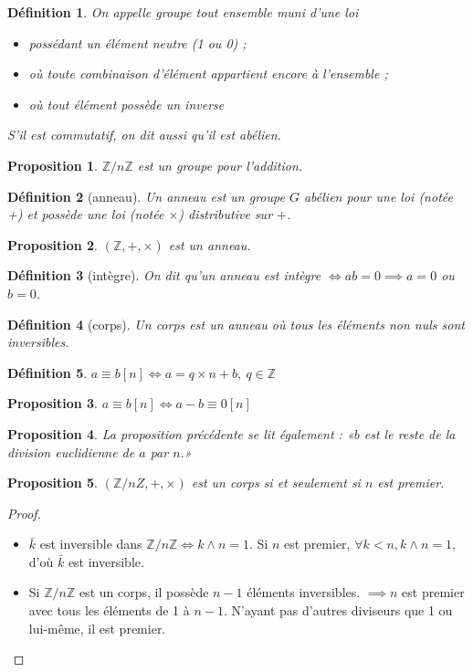 \documentclass[french]{article}
\newtheorem{definition}{Définition}
\newtheorem{proposition}{Proposition}
\newcommand{\Z}{\mathbb{Z}}
\begin{document}
  \begin{definition}
    On appelle \emph{groupe} tout ensemble muni d'une loi
    \begin{itemize}
      \item possédant un élément neutre (1 ou 0) ;
      \item où toute combinaison d'élément appartient encore à
        l'ensemble ;
      \item où tout élément possède un inverse
    \end{itemize}
    S'il est commutatif, on dit aussi qu'il est abélien.
  \end{definition}
  \begin{proposition}
    $\Z/n\Z$ est un groupe pour l'addition.
  \end{proposition}
  \begin{definition}[anneau]
    Un anneau est un groupe $G$ abélien pour une loi (notée +) et
    possède une loi (notée $\times$) distributive sur $+$.
  \end{definition}
  \begin{proposition}
    $(\Z,+,\times)$ est un anneau.
  \end{proposition}
  \begin{definition}[intègre]
    On dit qu'un anneau est intègre $\iff ab = 0 \implies a = 0$ ou $b =
    0$.
  \end{definition}
  \begin{definition}[corps]
    Un corps est un anneau où tous les éléments non nuls sont
    inversibles.
  \end{definition}

  \begin{definition}
    $a \equiv b [n] \iff a = q\times n + b,\ q\in\Z $
  \end{definition}
  \begin{proposition}
    $a \equiv b [n] \iff a - b \equiv 0 [n] $
  \end{proposition}
  \begin{proposition}
    La proposition précédente se lit également : «$b$ est le reste de
    la division euclidienne de $a$ par $n$.»
  \end{proposition}

  \begin{proposition}
    $(\Z/nZ,+,\times)$ est un corps si et seulement si $n$ est premier.
  \end{proposition}
  \begin{proof}
    \begin{itemize}
      \item $\bar{k}$ est inversible dans $\Z/n\Z \iff k\wedge n = 1$.
        Si $n$ est premier, $\forall k < n, k\wedge n = 1$, d'où
        $\bar{k}$ est inversible.
      \item Si $\Z/n\Z$ est un corps, il possède $n-1$ éléments
        inversibles. $\implies n$ est premier avec tous les éléments de
        1 à $n-1$. N'ayant pas d'autres diviseurs que 1 ou lui-même, il
        est premier.
    \end{itemize}
  \end{proof}
\end{document}
